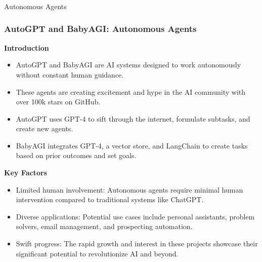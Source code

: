 \begin{frame}[fragile]\frametitle{}
\begin{center}
{\Large Autonomous Agents}
\end{center}
\end{frame}


\begin{frame}[fragile]
\frametitle{AutoGPT and BabyAGI: Autonomous Agents}

\textbf{Introduction}
\begin{itemize}
    \item AutoGPT and BabyAGI are AI systems designed to work autonomously without constant human guidance.
    \item These agents are creating excitement and hype in the AI community with over 100k stars on GitHub.
    \item AutoGPT uses GPT-4 to sift through the internet, formulate subtasks, and create new agents.
    \item BabyAGI integrates GPT-4, a vector store, and LangChain to create tasks based on prior outcomes and set goals.
\end{itemize}

\textbf{Key Factors}
\begin{itemize}
    \item Limited human involvement: Autonomous agents require minimal human intervention compared to traditional systems like ChatGPT.
    \item Diverse applications: Potential use cases include personal assistants, problem solvers, email management, and prospecting automation.
    \item Swift progress: The rapid growth and interest in these projects showcase their significant potential to revolutionize AI and beyond.
\end{itemize}

\end{frame}

